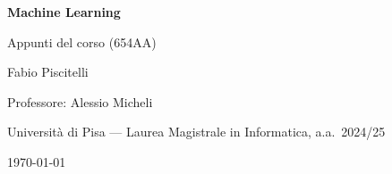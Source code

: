 \documentclass[11pt,a4paper,oneside,openany]{book}
\begin{document}
\hypersetup{pageanchor=false}
\begin{titlepage}
\centering
\vspace*{3cm}
{\Huge\bfseries\color{inkblue} Machine Learning\par}
\vspace{0.6cm}
{\Large\color{accentblue} Appunti del corso (654AA)\par}
\vspace{2.2cm}
{\large Fabio Piscitelli\par}
\vspace{0.4cm}
{\normalsize Professore: Alessio Micheli\par}
{\normalsize Università di Pisa --- Laurea Magistrale in Informatica, a.a.\ 2024/25\par}
\vfill
{\normalsize \today\par}
\end{titlepage}

\frontmatter
\hypersetup{pageanchor=true}
\tableofcontents

\mainmatter


























\end{document}
